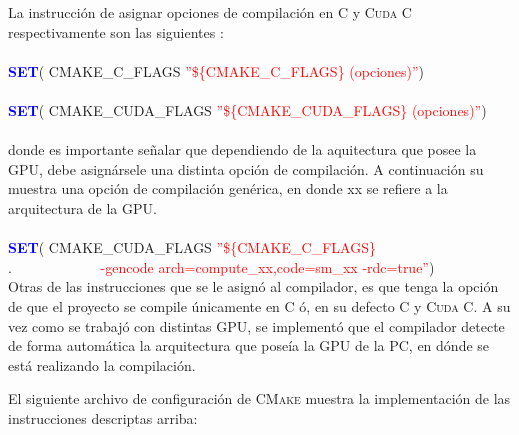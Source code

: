 La instrucción de asignar opciones de compilación en \textsc{C} y \textsc{Cuda C} respectivamente son las siguientes :
\\\\
\textcolor{blue}{\textbf{SET}}( CMAKE\_C\_FLAGS  \textcolor{red}{''\$\{CMAKE\_C\_FLAGS\} (opciones)''})
\\\\
\textcolor{blue}{\textbf{SET}}( CMAKE\_CUDA\_FLAGS  \textcolor{red}{''\$\{CMAKE\_CUDA\_FLAGS\} (opciones)''})
\\
\\
donde es importante señalar que dependiendo de la aquitectura que posee la GPU, debe asignársele una distinta opción de compilación. A continuación su muestra una opción de compilación genérica, en donde xx se refiere a la arquitectura de la GPU.
\\
\\
\textcolor{blue}{\textbf{SET}}( CMAKE\_CUDA\_FLAGS \textcolor{red}{''\$\{CMAKE\_C\_FLAGS\}}\\
                 $.\qquad \qquad \qquad $\textcolor{red}{ -gencode arch=compute\_xx,code=sm\_xx -rdc=true''})
\\


Otras de las instrucciones que se le asignó al compilador, es que tenga la opción de que el proyecto se  compile únicamente en \textsc{C} ó, en su defecto  \textsc{C} y \textsc{Cuda C}. A su vez como se trabajó con distintas GPU, se implementó que el compilador detecte de forma automática la arquitectura que poseía la GPU de la PC, en dónde se está realizando la compilación. 

El siguiente archivo de configuración de \textsc{CMake} muestra la implementación de las instrucciones descriptas arriba:
\newpage

